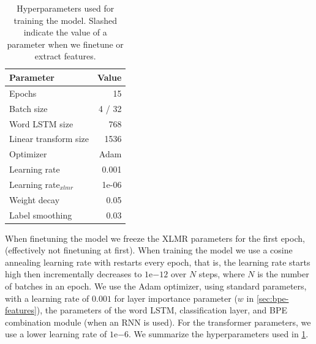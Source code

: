 \documentclass[11pt]{article}
\begin{document}
    	\begin{table}
		\centering
		\begin{tabular}{lr} \\
			Parameter & Value \\
			\hline
			Epochs & 15 \\
			Batch size & 4 / 32 \\
            Word LSTM size & 768 \\
            Linear transform size & 1536 \\
			Optimizer & Adam \\
			Learning rate & 0.001 \\
			Learning rate$_{xlmr}$ & 1e-06 \\
            Weight decay & 0.05 \\
			Label smoothing & 0.03 \\
		\end{tabular}
    		\caption{\label{tab:parameters} Hyperparameters used for
     training the model. Slashed indicate the value of a parameter
     when we finetune or extract features.}
	\end{table}
     
             When finetuning the model we freeze the XLMR parameters
     for the first epoch, (effectively not finetuning at first).
      When training the model we use a cosine annealing learning rate
     with restarts every epoch, that is, the learning rate starts high
     then incrementally decreases to $1\mathrm{e}{-12}$ over $N$
     steps, where $N$ is the number of batches in an epoch. We use the
     Adam optimizer, using standard parameters, with a learning rate
     of $0.001$ for layer importance parameter ($w$ in
     \cref{sec:bpe-features}), the parameters of the word LSTM,
     classification layer, and BPE combination module (when an RNN is
     used). For the transformer parameters, we use a lower learning
     rate of $1\mathrm{e}{-6}$. We summarize the hyperparameters used
     in \cref{tab:parameters}.
\end{document}
